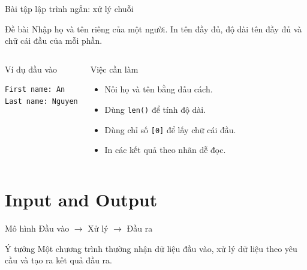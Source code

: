 \documentclass[aspectratio=169,10pt]{beamer}
\begin{document}
\begin{frame}[fragile]{Bài tập lập trình ngắn: xử lý chuỗi}
\small
\begin{block}{Đề bài}
Nhập họ và tên riêng của một người. In tên đầy đủ, độ dài tên đầy đủ và chữ cái đầu của mỗi phần.
\end{block}
\begin{columns}[T,onlytextwidth]
\begin{block}{Ví dụ đầu vào}
\begin{lstlisting}[language={}]
First name: An
Last name: Nguyen
\end{lstlisting}
\end{block}
\begin{block}{Việc cần làm}
\begin{itemize}
  \item Nối họ và tên bằng dấu cách.
  \item Dùng \texttt{len()} để tính độ dài.
  \item Dùng chỉ số \texttt{[0]} để lấy chữ cái đầu.
  \item In các kết quả theo nhãn dễ đọc.
\end{itemize}
\end{block}
\end{columns}
\end{frame}

\section{Input and Output}

\begin{frame}{Mô hình Đầu vào $\rightarrow$ Xử lý $\rightarrow$ Đầu ra}
\begin{center}
\end{center}
\begin{block}{Ý tưởng}
Một chương trình thường nhận dữ liệu đầu vào, xử lý dữ liệu theo yêu cầu và tạo ra kết quả đầu ra.
\end{block}
\end{frame}
\end{document}
